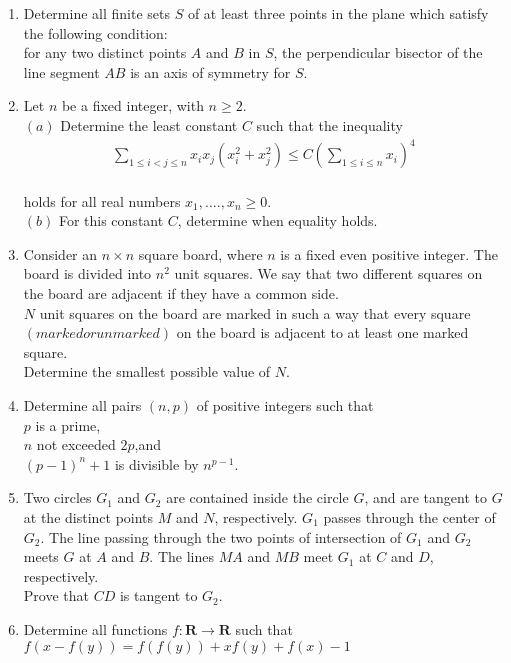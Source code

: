 \documentclass[12pt,-letter paper]{article}
\providecommand{\brak}[1]{\ensuremath{\left(#1\right)}}
\begin{document}
\begin{enumerate}
\item Determine all finite sets $S$ of at least three points in the plane which satisfy the following condition:\\for any two distinct points $A$ and $B$ in $S$, the perpendicular bisector of the line segment $AB$ is an axis of symmetry for $S$.
\item  Let $n$ be a fixed integer, with $n \geq 2$.\\ $\brak{a}$ Determine the least constant $C$ such that the inequality \\\begin{align*}\sum_{1\leq i<j\leq n} {x_{i}} {x_{j}} \brak{x_{i}^2 + x_{j}^2} \leq C \brak{\sum_{1\leq i\leq n} x_{i}}^4\end{align*}\\ holds for all real numbers ${x_{1}},....,{x_{n}} \geq 0$.\\ $\brak{b}$ For this constant $C$, determine when equality holds.
\item Consider an $n \times n$ square board, where $n$ is a fixed even positive integer. The board is divided into $n^2$ unit squares. We say that two different squares on the board are adjacent if they have a common side.\\$N$ unit squares on the board are marked in such a way that every square \brak{marked or unmarked} on the board is adjacent to at least one marked square.\\Determine the smallest possible value of $N$.
\item Determine all pairs \brak{n,p} of positive integers such that\\$p$ is a prime,\\$n$ not exceeded $2p$,and\\ $\brak{p-1}^n+1$ is divisible by $n^{p-1}$.
\item Two circles ${G_{1}}$ and ${G_{2}}$ are contained inside the circle $G$, and are tangent to $G$ at the distinct points $M$ and $N$, respectively. ${G_{1}}$ passes through the center of ${G_{2}}$. The line passing through the two points of intersection of ${G_{1}}$ and ${G_{2}}$ meets $G$ at $A$ and $B$. The lines $MA$ and $MB$ meet ${G_{1}}$ at $C$ and $D$, respectively.\\ Prove that $CD$ is tangent to ${G_{2}}$.	
\item Determine all functions $f: \textbf{R} \to \textbf{R}$ such that\\$f\brak{x - f\brak{y}} = f\brak{f\brak{y}} + xf\brak{y} + f\brak{x} - 1$
\end{enumerate}
\end{document}
